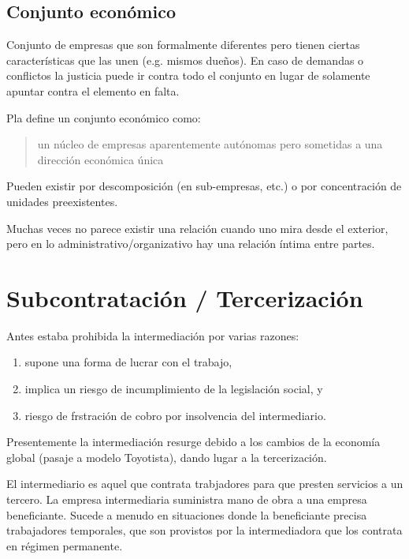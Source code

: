 \documentclass[../main.tex]{subfiles}
\begin{document}
\subsection{Conjunto económico}

Conjunto de empresas que son formalmente diferentes pero tienen ciertas características que las unen (e.g. mismos dueños).
En caso de demandas o conflictos la justicia puede ir contra todo el conjunto en lugar de solamente apuntar contra el elemento en falta.

Pla define un conjunto económico como: \blockquote{un núcleo de empresas aparentemente autónomas pero sometidas a una dirección económica única}

Pueden existir por descomposición (en sub-empresas, etc.) o por concentración de unidades preexistentes.

Muchas veces no parece existir una relación cuando uno mira desde el exterior, pero en lo administrativo/organizativo hay una relación íntima entre partes.

\section{Subcontratación / Tercerización}

Antes estaba prohibida la intermediación por varias razones:

\begin{enumerate}
	\item supone una forma de lucrar con el trabajo,
	
	\item implica un riesgo de incumplimiento de la legislación social, y 
	
	\item riesgo de frstración de cobro por insolvencia del intermediario.
\end{enumerate}

Presentemente la intermediación resurge debido a los cambios de la economía global (pasaje a modelo Toyotista), dando lugar a la tercerización.

El intermediario es aquel que contrata trabjadores para que presten servicios a un tercero.
La empresa intermediaria suministra mano de obra a una empresa beneficiante.
Sucede a menudo en situaciones donde la beneficiante precisa trabajadores temporales, que son provistos por la intermediadora que los contrata en régimen permanente.
\end{document}
